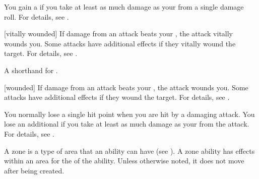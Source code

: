  You gain a  if you take at least as much damage as your  from a single damage roll.
For details, see .

[vitally wounded] If damage from an attack beats your , the attack vitally wounds you.
Some attacks have additional effects if they vitally wound the target.
For details, see .

 A shorthand for .

[wounded] If damage from an attack beats your , the attack wounds you.
Some attacks have additional effects if they wound the target.
For details, see .

 You normally lose a single hit point when you are hit by a damaging attack.
You lose an additional  if you take at least as much damage as your  from the attack.
For details, see .

 A zone is a type of area that an ability can have (see ).
A zone ability has effects within an area for the  of the ability.
Unless otherwise noted, it does not move after being created.
